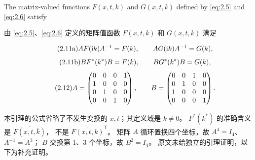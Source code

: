 
\begin{paperlemmaen}\label{lem:2.1}
The matrix-valued functions $F(x,t,k)$ and $G(x,t,k)$ defined by
\eqref{eq:2.5} and \eqref{eq:2.6} satisfy
\end{paperlemmaen}
\begin{paperlemmacn*}
由 \eqref{eq:2.5}、\eqref{eq:2.6} 定义的矩阵值函数
$F(x,t,k)$ 和 $G(x,t,k)$ 满足
\end{paperlemmacn*}
\begin{equation}
\originaleq{2.11a}
AF(\ii k)A^{-1}=F(k),\qquad AG(\ii k)A^{-1}=G(k),
\end{equation}
\begin{equation}
\originaleq{2.11b}
BF^*(k^*)B=F(k),\qquad BG^*(k^*)B=G(k),
\end{equation}
\begin{equation}
\originaleq{2.12}
A=\begin{pmatrix}0&0&0&1\\1&0&0&0\\0&1&0&0\\0&0&1&0\end{pmatrix},\qquad
B=\begin{pmatrix}0&0&1&0\\0&1&0&0\\1&0&0&0\\0&0&0&1\end{pmatrix}.
\end{equation}

\begin{note}
本引理的公式省略了不发生变换的 $x,t$；其定义域是 $k\ne0$。
$F^*(k^*)$ 的准确含义是 $\overline{F(x,t,\overline{k})}$，
不是 $\overline{F(x,t,k)}^{\mathsf T}$。
矩阵 $A$ 循环置换四个坐标，故 $A^4=I_4$、$A^{-1}=A^3$；
$B$ 交换第 1、3 个坐标，故 $B^2=I_4$。
原文未给独立的引理证明，以下为补充证明。
\end{note}

